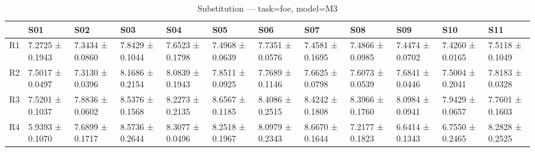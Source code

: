 \begin{table}[htbp]
\centering
\caption{Substitution — task=foe, model=M3}
\label{tab:sub:foe:M3}
\begin{tabular}{llllllllllll}
\toprule
\toprule
 & S01 & S02 & S03 & S04 & S05 & S06 & S07 & S08 & S09 & S10 & S11 \\
\midrule
\midrule
R1 & 7.2725 ± 0.1943 & 7.3434 ± 0.0860 & 7.8429 ± 0.1044 & 7.6523 ± 0.1798 & 7.4968 ± 0.0639 & 7.7351 ± 0.0576 & 7.4581 ± 0.1695 & 7.4866 ± 0.0985 & 7.4474 ± 0.0702 & 7.4260 ± 0.0165 & 7.5118 ± 0.1049 \\
R2 & 7.5017 ± 0.0497 & 7.3130 ± 0.0396 & 8.1686 ± 0.2154 & 8.0839 ± 0.1943 & 7.8511 ± 0.0925 & 7.7689 ± 0.1146 & 7.6625 ± 0.0798 & 7.6073 ± 0.0539 & 7.6841 ± 0.0446 & 7.5004 ± 0.2041 & 7.8183 ± 0.0328 \\
R3 & 7.5201 ± 0.1037 & 7.8836 ± 0.0602 & 8.5376 ± 0.1568 & 8.2273 ± 0.2135 & 8.6567 ± 0.1185 & 8.4086 ± 0.2515 & 8.4242 ± 0.1808 & 8.3966 ± 0.1760 & 8.0984 ± 0.0941 & 7.9429 ± 0.0657 & 7.7601 ± 0.1603 \\
R4 & 5.9393 ± 0.1070 & 7.6899 ± 0.1717 & 8.5736 ± 0.2644 & 8.3077 ± 0.0496 & 8.2518 ± 0.1967 & 8.0979 ± 0.2343 & 8.6670 ± 0.1644 & 7.2177 ± 0.1823 & 6.6414 ± 0.1343 & 6.7550 ± 0.2465 & 8.2828 ± 0.2525 \\
\bottomrule
\end{tabular}\end{table}
